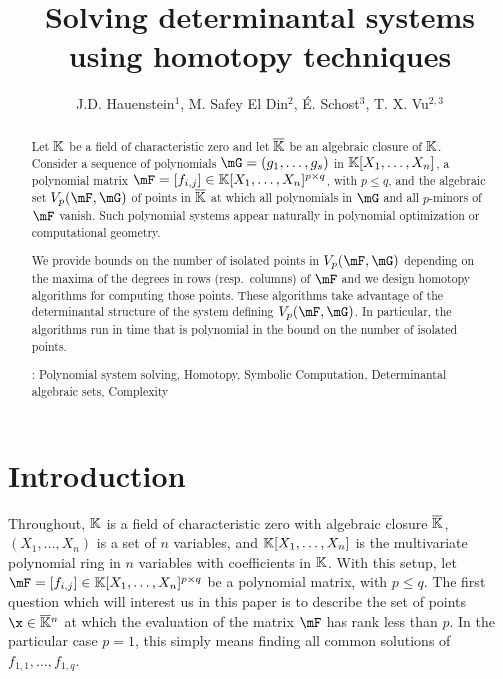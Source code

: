 \documentclass[12pt]{article}
\title{Solving determinantal systems using 
homotopy techniques}
\author{J.D. Hauenstein$^{1}$, M. {Safey El Din}$^{2}$, \'E. Schost$^{3}$, T. X. Vu$^{2,3}$}
\begin{document}
\maketitle
{}

\begin{abstract}
  Let $\mathbb{K}$ be a field of characteristic zero and let $\overline{\mathbb{K}}$ be an
  algebraic closure of $\mathbb{K}$. Consider a sequence of polynomials
  $\mG=(g_1,\dots,g_s)$ in $\mathbb{K}[X_1,\dots,X_n]$, a polynomial matrix
  $\mF=[f_{i,j}] \in \KK[X_1,\dots,X_n]^{p \times q}$, with $p \leq
  q$, and the algebraic set $\VpFG{p}{\mF}{\mG}$ of points in $\overline{\mathbb{K}}$
  at which all polynomials in $\mG$ and all $p$-minors of $\mF$
  vanish. Such polynomial systems appear naturally in polynomial
  optimization or computational geometry.

  We provide bounds on the number of isolated points in
  $\VpFG{p}{\mF}{\mG}$ depending on the maxima of the degrees in rows
  (resp.\ columns) of $\mF$ and we design homotopy algorithms for
  computing those points. These algorithms take advantage of the
  determinantal structure of the system defining
  $\VpFG{p}{\mF}{\mG}$. In particular, the algorithms 
  run in time that is 
  polynomial in the bound on the number of isolated points.

\smallskip{}: Polynomial system solving, Homotopy, Symbolic Computation, Determinantal algebraic sets, Complexity

\end{abstract}

\section{Introduction}\label{sec:intro}

Throughout, $\mathbb{K}$ is a field of characteristic zero with algebraic
closure $\overline{\mathbb{K}}$, $(X_1, \ldots, X_n)$ is a set of $n$ variables, and
$\mathbb{K}[X_1,\dots,X_n]$ is the multivariate polynomial ring in $n$
variables with coefficients in $\mathbb{K}$.  With this setup, let
$\mF=[f_{i,j}] \in \KK[X_1,\dots,X_n]^{p \times q}$ be a polynomial
matrix, with $p \leq q$. The first question which will interest us in
this paper is to describe the set of points $\x \in \KKbar{}^n$ at
which the evaluation of the matrix $\mF$ has rank less than $p$.  In
the particular case $p=1$, this simply means finding all common
solutions of $f_{1,1},\dots,f_{1,q}$.
\end{document}
